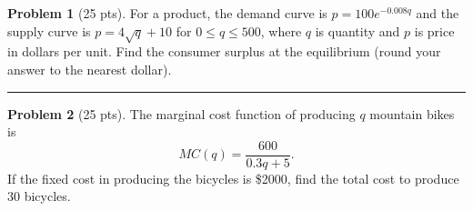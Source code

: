 \documentclass[12pt]{article}
\theoremstyle{definition}
\newtheorem{problem}{Problem}
\begin{document}
\bigskip
\begin{problem}[25 pts]
For a product, the demand curve is $p=100e^{-0.008q}$ and the supply curve is $p=4\sqrt{q}+10$ for $0 \leq q \leq 500$, where $q$ is quantity and $p$ is price in dollars per unit.  Find the consumer surplus at the equilibrium (round your answer to the nearest dollar).
\vspace{10cm}
\end{problem}
\hrule

\begin{problem}[25 pts]
The marginal cost function of producing $q$ mountain bikes is 
\begin{equation*}
MC(q) = \frac{600}{0.3q+5}.
\end{equation*}
If the fixed cost in producing the bicycles is \$2000, find the total cost to produce 30 bicycles.
\end{problem}
\end{document}
